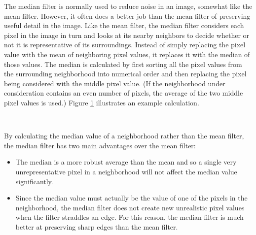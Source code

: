 The median filter is normally used to 
reduce noise in an image, somewhat 
like the mean filter. However, it often 
does a better job than the mean filter 
of preserving useful detail in the 
image. Like the mean filter, the 
median filter considers each pixel in 
the image in turn and looks at its 
nearby neighbors to decide whether or 
not it is representative of its 
surroundings. Instead of simply replacing the pixel value with the mean of neighboring pixel 
values, it replaces it with the median of those values. The median is calculated by first sorting 
all the pixel values from the surrounding neighborhood into numerical order and then replacing 
the pixel being considered with the middle pixel value. (If the neighborhood under consideration 
contains an even number of pixels, the average of the two middle pixel values is used.) Figure \ref{fig:fig7}
illustrates an example calculation.

\begin{figure}[h]
\begin{dBox}
\centering
\mbox{
   }
   \caption{
   \label{fig:fig7} }   
\end{dBox}   
\end{figure}
\bigskip

By calculating the median value of a neighborhood rather than the mean filter, the median filter 
has two main advantages over the mean filter: 
\begin{itemize}
\item The median is a more robust average than the mean and so a single very 
unrepresentative pixel in a neighborhood will not affect the median value significantly. 
\item Since the median value must actually be the value of one of the pixels in the 
neighborhood, the median filter does not create new unrealistic pixel values when the 
filter straddles an edge. For this reason, the median filter is much better at preserving 
sharp edges than the mean filter.
\end{itemize}

